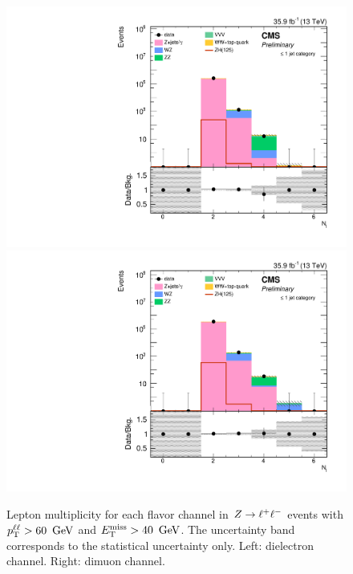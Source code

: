 \begin{figure}[hbtp]
\begin{center}
\includegraphics[width=\cmsFigWidth]{figures/zsel_nlep_ee.pdf}
\includegraphics[width=\cmsFigWidth]{figures/zsel_nlep_mm.pdf}
\caption{
  Lepton multiplicity for each flavor channel in $Z\to\ell^+\ell^-$ events with $p_{\mathrm{T}}^{\ell\ell} > 60~\,\text{Ge\hspace{-.08em}V}$ and $E_\mathrm{T}^{\mathrm{miss}} > 40~\,\text{Ge\hspace{-.08em}V}$. 
  The uncertainty band corresponds to the statistical uncertainty only. Left: dielectron channel. Right: dimuon channel.
}
\label{fig:distributions_zsel_nlep}
\end{center}
\end{figure}
